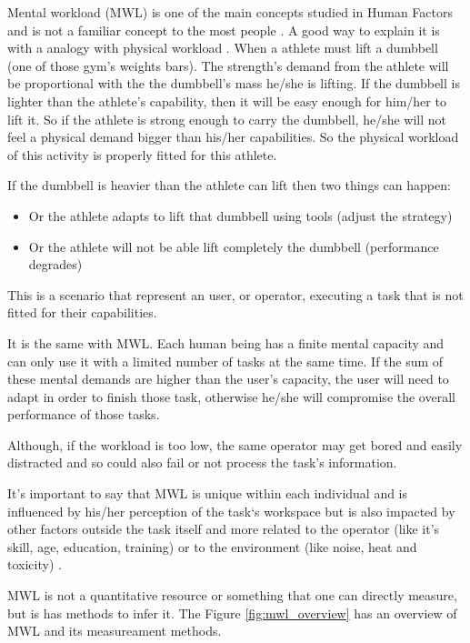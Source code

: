 
Mental workload (MWL) is one of the main concepts studied in Human Factors  and is not a familiar concept to the most people \cite{stanton2004handbook}. A good way to explain it is with a analogy with physical workload \cite{stanton2004handbook}. When a athlete must lift a dumbbell (one of those gym's weights bars). The strength's demand from the athlete will be proportional with the the dumbbell's mass he/she is lifting. If the dumbbell is lighter than the athlete's capability, then it will be easy enough for him/her to lift it. So if the athlete is strong enough to carry the dumbbell, he/she will not feel a physical demand bigger than his/her capabilities. So the physical workload of this activity is properly fitted for this athlete.

If the dumbbell is heavier than the athlete can lift then two things can happen:
\begin{itemize}
    \item Or the athlete adapts to lift that dumbbell using tools (adjust the strategy)
    \item Or the athlete will not be able lift completely the dumbbell (performance degrades)
\end{itemize}

This is a scenario that represent an user, or operator, executing a task that is not fitted for their capabilities.

It is the same with MWL. Each human being has a finite mental capacity and can only use it with a limited number of tasks at the same time. If the sum of these mental demands are higher than the user's capacity, the user will need to adapt in order to finish those task, otherwise he/she will compromise the overall performance of those tasks.

Although, if the workload is too low, the same operator may get bored and easily distracted and so could also fail or not process the task's information.  

It's important to say that MWL is unique within each individual and is influenced by his/her perception of the task`s workspace but is also impacted by other factors outside the task itself and more related to the operator (like it's skill, age, education, training) or to the environment (like noise, heat and toxicity) \cite{cain2007review, fallahi2016effects, cardoso2012evaluation}.

MWL is not a quantitative resource or something that one can directly measure, but is has methods to infer it. The Figure \ref{fig:mwl_overview} has an overview of MWL and its measureament methods.
        

